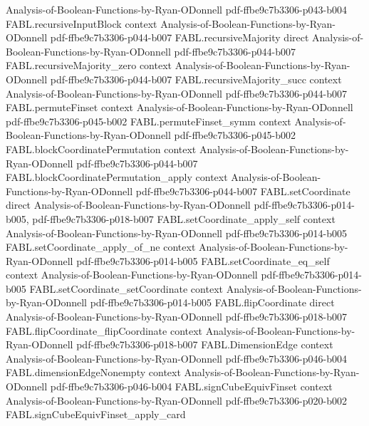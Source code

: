 \begin{theorem}
  {Analysis-of-Boolean-Functions-by-Ryan-ODonnell}
  {pdf-ffbe9c7b3306-p043-b004}
\proofstep
  {FABL.recursiveInputBlock}
  {context}
  {Analysis-of-Boolean-Functions-by-Ryan-ODonnell}
  {pdf-ffbe9c7b3306-p044-b007}
\proofstep
  {FABL.recursiveMajority}
  {direct}
  {Analysis-of-Boolean-Functions-by-Ryan-ODonnell}
  {pdf-ffbe9c7b3306-p044-b007}
\proofstep
  {FABL.recursiveMajority_zero}
  {context}
  {Analysis-of-Boolean-Functions-by-Ryan-ODonnell}
  {pdf-ffbe9c7b3306-p044-b007}
\proofstep
  {FABL.recursiveMajority_succ}
  {context}
  {Analysis-of-Boolean-Functions-by-Ryan-ODonnell}
  {pdf-ffbe9c7b3306-p044-b007}
\proofstep
  {FABL.permuteFinset}
  {context}
  {Analysis-of-Boolean-Functions-by-Ryan-ODonnell}
  {pdf-ffbe9c7b3306-p045-b002}
\proofstep
  {FABL.permuteFinset_symm}
  {context}
  {Analysis-of-Boolean-Functions-by-Ryan-ODonnell}
  {pdf-ffbe9c7b3306-p045-b002}
\proofstep
  {FABL.blockCoordinatePermutation}
  {context}
  {Analysis-of-Boolean-Functions-by-Ryan-ODonnell}
  {pdf-ffbe9c7b3306-p044-b007}
\proofstep
  {FABL.blockCoordinatePermutation_apply}
  {context}
  {Analysis-of-Boolean-Functions-by-Ryan-ODonnell}
  {pdf-ffbe9c7b3306-p044-b007}
\proofstep
  {FABL.setCoordinate}
  {direct}
  {Analysis-of-Boolean-Functions-by-Ryan-ODonnell}
  {pdf-ffbe9c7b3306-p014-b005,
    pdf-ffbe9c7b3306-p018-b007}
\proofstep
  {FABL.setCoordinate_apply_self}
  {context}
  {Analysis-of-Boolean-Functions-by-Ryan-ODonnell}
  {pdf-ffbe9c7b3306-p014-b005}
\proofstep
  {FABL.setCoordinate_apply_of_ne}
  {context}
  {Analysis-of-Boolean-Functions-by-Ryan-ODonnell}
  {pdf-ffbe9c7b3306-p014-b005}
\proofstep
  {FABL.setCoordinate_eq_self}
  {context}
  {Analysis-of-Boolean-Functions-by-Ryan-ODonnell}
  {pdf-ffbe9c7b3306-p014-b005}
\proofstep
  {FABL.setCoordinate_setCoordinate}
  {context}
  {Analysis-of-Boolean-Functions-by-Ryan-ODonnell}
  {pdf-ffbe9c7b3306-p014-b005}
\proofstep
  {FABL.flipCoordinate}
  {direct}
  {Analysis-of-Boolean-Functions-by-Ryan-ODonnell}
  {pdf-ffbe9c7b3306-p018-b007}
\proofstep
  {FABL.flipCoordinate_flipCoordinate}
  {context}
  {Analysis-of-Boolean-Functions-by-Ryan-ODonnell}
  {pdf-ffbe9c7b3306-p018-b007}
\proofstep
  {FABL.DimensionEdge}
  {context}
  {Analysis-of-Boolean-Functions-by-Ryan-ODonnell}
  {pdf-ffbe9c7b3306-p046-b004}
\proofstep
  {FABL.dimensionEdgeNonempty}
  {context}
  {Analysis-of-Boolean-Functions-by-Ryan-ODonnell}
  {pdf-ffbe9c7b3306-p046-b004}
\proofstep
  {FABL.signCubeEquivFinset}
  {context}
  {Analysis-of-Boolean-Functions-by-Ryan-ODonnell}
  {pdf-ffbe9c7b3306-p020-b002}
\proofstep
  {FABL.signCubeEquivFinset_apply_card}

\end{theorem}
